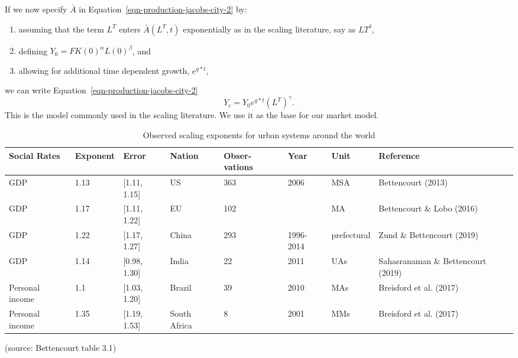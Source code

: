 If we now specify $\bar A$ in Equation~\ref{eqn-production-jacobs-city-2} by: \begin{enumerate}
    \item   assuming that the term $L^T$ enters $\bar A(L^T, t)$ exponentially as in the scaling literature, say as $LT^\delta$,  
    \item defining $Y_0=F K(0)^\alpha L(0)^\beta$, and 
    \item allowing  for additional time dependent growth, $e^{g*t}$,
\end{enumerate}
we can write Equation~\ref{eqn-production-jacobs-city-2} 
\begin{equation}Y_c = Y_0e^{g*t}(L^T)^\gamma. \label{eqn-production-jacobs-scale}
\end{equation}
This is the model commonly used in the scaling literature. We use it as the base for our market model. 



\begin{table}[htb]\small
\centering
\begin{tabular}{|p{1.5cm}|l|l|p{1.5cm}|p{1.4cm}|p{}|l|p{2.5cm}|}\hline
\textbf{Social Rates} & \textbf{Exponent} & \textbf{Error} & \textbf{Nation} & \textbf{Obser-vations} & \textbf{Year} & \textbf{Unit} & \textbf{Reference} \\ \hline   
GDP             & 1.13 & [1.11, 1.15]  & US           & 363 & 2006        & MSA  & Bettencourt (2013)                 \\ \hline
GDP             & 1.17 & [1.11, 1.22]  & EU           & 102 &             & MA   & Bettencourt  \& Lobo        (2016) \\ \hline
GDP             & 1.22 & [1.17, 1.27]  & China        & 293 & 1996-2014   & prefectural & Zund  \& Bettencourt (2019) \\ \hline
GDP             & 1.14 & [0.98, 1.30]  & India        & 22  & 2011        & UAs  & Sahasranaman \& Bettencourt (2019) \\ \hline
Personal income & 1.1  & [1.03, 1.20]  & Brazil       & 39  & 2010        & MAs  & Breisford et al.  (2017)           \\ \hline
Personal income & 1.35 & [1.19, 1.53]  & South Africa & 8   & 2001        & MMs  & Breisford et al.  (2017)           \\ \hline
\end{tabular}
\caption[Observed scaling exponents]{Observed scaling exponents for urban systems around the world} \label{table-scaling-exponents} (source: Bettencourt \cite{bettencourtIntroductionUrbanScience2021} table 3.1)

\end{table}


